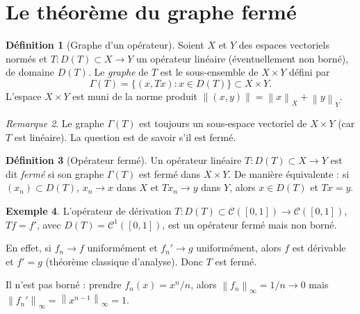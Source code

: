 \documentclass[a4paper,12pt]{book}
\newcommand{\norm}[1]{\left\| #1 \right\|}
\theoremstyle{definition}
\newtheorem{definition}{Définition}[chapter]
\newtheorem{exemple}[definition]{Exemple}
\theoremstyle{plain}
\theoremstyle{remark}
\newtheorem{remarque}[definition]{Remarque}
\begin{document}
\section{Le théorème du graphe fermé}
\label{sec:graphe-ferme}


\begin{definition}[Graphe d'un opérateur]
\label{def:graphe}
Soient $X$ et $Y$ des espaces vectoriels normés et $T : D(T) \subset X \to Y$
un opérateur linéaire (éventuellement non borné),
de domaine $D(T)$. Le \emph{graphe} de $T$ est
le sous-ensemble de $X \times Y$ défini par
\[
  \Gamma(T) = \bigl\{ (x, Tx) : x \in D(T) \bigr\} \subset X \times Y.
\]
L'espace $X \times Y$ est muni de la norme produit
$\norm{(x,y)} = \norm{x}_X + \norm{y}_Y$.
\end{definition}

\begin{remarque}
\label{rem:graphe-sous-espace}
Le graphe $\Gamma(T)$ est toujours un sous-espace vectoriel de $X \times Y$
(car $T$ est linéaire). La question est de savoir s'il est fermé.
\end{remarque}

\begin{definition}[Opérateur fermé]
\label{def:operateur-ferme}
Un opérateur linéaire $T : D(T) \subset X \to Y$ est dit \emph{fermé}
si son graphe $\Gamma(T)$ est fermé dans $X \times Y$. De manière
équivalente : si $(x_n) \subset D(T)$, $x_n \to x$ dans $X$ et $Tx_n \to y$
dans $Y$, alors $x \in D(T)$ et $Tx = y$.
\end{definition}

\begin{exemple}
\label{ex:derivation-fermee}
L'opérateur de dérivation $T : D(T) \subset \mathcal{C}([0,1]) \to \mathcal{C}([0,1])$,
$Tf = f'$, avec $D(T) = \mathcal{C}^1([0,1])$, est un opérateur fermé mais non borné.

En effet, si $f_n \to f$ uniformément et $f_n' \to g$ uniformément, alors
$f$ est dérivable et $f' = g$ (théorème classique d'analyse). Donc $T$ est fermé.

Il n'est pas borné : prendre $f_n(x) = x^n / n$, alors $\norm{f_n}_\infty = 1/n \to 0$
mais $\norm{f_n'}_\infty = \norm{x^{n-1}}_\infty = 1$.
\end{exemple}
\end{document}
